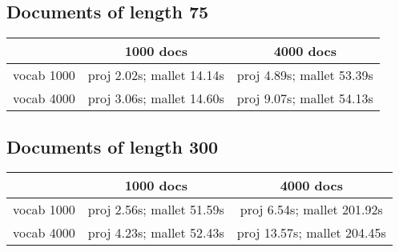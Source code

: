 \documentclass{article}
\begin{document}
\subsection*{Documents of length 75}

\begin{tabular}{c|cc}
    & 1000 docs & 4000 docs \\
    \hline
    vocab 1000 & proj 2.02s; mallet 14.14s & proj 4.89s; mallet 53.39s \\
    vocab 4000 & proj 3.06s; mallet 14.60s & proj 9.07s; mallet 54.13s
\end{tabular}

\subsection*{Documents of length 300}

\begin{tabular}{c|cc}
    & 1000 docs & 4000 docs \\
    \hline
    vocab 1000 & proj 2.56s; mallet 51.59s & proj 6.54s; mallet 201.92s \\
    vocab 4000 & proj 4.23s; mallet 52.43s & proj 13.57s; mallet 204.45s
\end{tabular}
\end{document}
